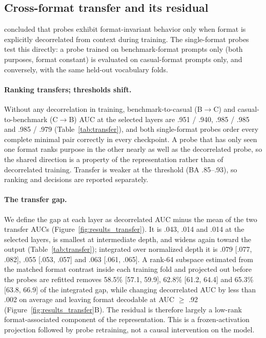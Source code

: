 \subsection{Cross-format transfer and its residual}
\label{sec:results_transfer}

\citet{devbunova2026format} concluded that probes exhibit format-invariant
behavior only when format is explicitly decorrelated from context during
training. The single-format probes test this directly: a probe trained on
benchmark-format prompts only (both purposes, format constant) is evaluated on
casual-format prompts only, and conversely, with the same held-out vocabulary
folds.

\paragraph{Ranking transfers; thresholds shift.}
Without any decorrelation in training, benchmark-to-casual (B$\rightarrow$C)
and casual-to-benchmark (C$\rightarrow$B) AUC at the selected layers are
.951 / .940, .985 / .985 and .985 / .979 (Table~\ref{tab:transfer}), and both
single-format probes order every complete minimal pair correctly in every
checkpoint. A probe that has only seen one format ranks purpose in the other
nearly as well as the decorrelated probe, so the shared direction is a
property of the representation rather than of decorrelated training. Transfer
is weaker at the threshold (BA .85--.93), so ranking and decisions are
reported separately.

\paragraph{The transfer gap.}
We define the gap at each layer as decorrelated AUC minus the mean of the two
transfer AUCs (Figure~\ref{fig:results_transfer}). It is .043, .014 and .014 at
the selected layers, is smallest at intermediate depth, and widens again
toward the output (Table~\ref{tab:transfer}); integrated over normalized depth
it is .079 [.077, .082], .055 [.053, .057] and .063 [.061, .065]. A rank-64
subspace estimated from the matched format contrast inside each training fold
and projected out before the probes are refitted removes 58.5\% [57.1, 59.9],
62.8\% [61.2, 64.4] and 65.3\% [63.8, 66.9] of the integrated gap, while
changing decorrelated AUC by less than .002 on average and leaving format
decodable at AUC $\geq$ .92 (Figure~\ref{fig:results_transfer}B). The
residual is therefore largely a low-rank format-associated component of the
representation. This is a frozen-activation projection followed by probe
retraining, not a causal intervention on the model.

